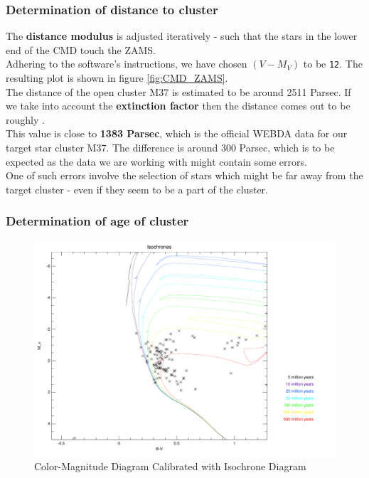 \documentclass[12pt,a4paper]{article}
\begin{document}
\subsubsection*{Determination of distance to cluster}
The \textbf{distance modulus} is adjusted iteratively - such that the stars in the lower end of the CMD touch the ZAMS. 
\\ Adhering to the software's instructions, we have chosen $(V - M_V)$ to be \texttt{12}. The resulting plot is shown in figure \ref{fig:CMD_ZAMS}.
\\ The distance of the open cluster M37 is estimated to be around 2511 Parsec. If we take into account the \textbf{extinction factor} then the distance comes out to be roughly .
\\ This value is close to \textbf{ 1383 Parsec}, which is the official WEBDA data for our target star cluster M37. The difference is around 300 Parsec, which is to be expected as the data we are working with might contain some errors. 
\\ One of such errors involve the selection of stars which might be far away from the target cluster - even if they seem to be a part of the cluster.
\subsubsection*{Determination of age of cluster}
\begin{figure}[H]
  \centering
  \includegraphics[width=1.0\textwidth]{Pictures/ISO_M37_2.pdf}
  \caption{ Color-Magnitude Diagram Calibrated with Isochrone Diagram}
  \label{fig:CMD_ISO}
\end{figure}
\end{document}
